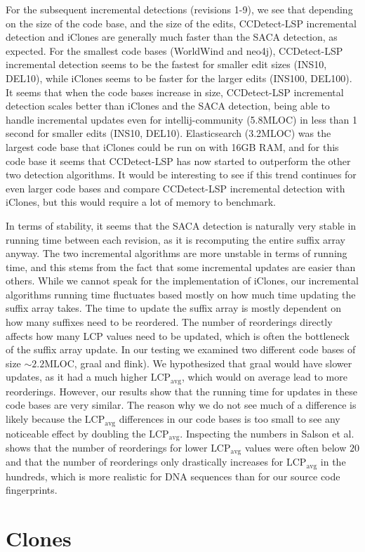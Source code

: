 For the subsequent incremental detections (revisions 1-9), we see that depending on the
size of the code base, and the size of the edits, CCDetect-LSP incremental detection and
iClones are generally much faster than the SACA detection, as expected. For the smallest
code bases (WorldWind and neo4j), CCDetect-LSP incremental detection seems to be the
fastest for smaller edit sizes (INS10, DEL10), while iClones seems to be faster for the
larger edits (INS100, DEL100). It seems that when the code bases increase in size,
CCDetect-LSP incremental detection scales better than iClones and the SACA detection,
being able to handle incremental updates even for intellij-community (5.8MLOC) in less
than 1 second for smaller edits (INS10, DEL10). Elasticsearch (3.2MLOC) was the largest
code base that iClones could be run on with 16GB RAM, and for this code base it seems that
CCDetect-LSP has now started to outperform the other two detection algorithms. It would be
interesting to see if this trend continues for even larger code bases and compare
CCDetect-LSP incremental detection with iClones, but this would require a lot of memory to
benchmark.

In terms of stability, it seems that the SACA detection is naturally very stable in
running time between each revision, as it is recomputing the entire suffix array anyway.
The two incremental algorithms are more unstable in terms of running time, and this stems
from the fact that some incremental updates are easier than others. While we cannot speak
for the implementation of iClones, our incremental algorithms running time fluctuates
based mostly on how much time updating the suffix array takes. The time to update the
suffix array is mostly dependent on how many suffixes need to be reordered. The number of
reorderings directly affects how many LCP values need to be updated, which is often the
bottleneck of the suffix array update. In our testing we examined two different code bases
of size $\sim2.2\text{MLOC}$, graal and flink). We hypothesized that graal would have
slower updates, as it had a much higher $\text{LCP}_\text{avg}$, which would on average
lead to more reorderings. However, our results show that the running time for updates in
these code bases are very similar. The reason why we do not see much of a difference is
likely because the $\text{LCP}_\text{avg}$ differences in our code bases is too small to
see any noticeable effect by doubling the $\text{LCP}_\text{avg}$. Inspecting the numbers
in Salson et al.\cite{DynamicExtendedSuffixArraysReorderings} shows that the number of
reorderings for lower $\text{LCP}_\text{avg}$ values were often below $20$ and that the
number of reorderings only drastically increases for $\text{LCP}_\text{avg}$ in the
hundreds, which is more realistic for DNA sequences than for our source code fingerprints.


\section{Clones}

